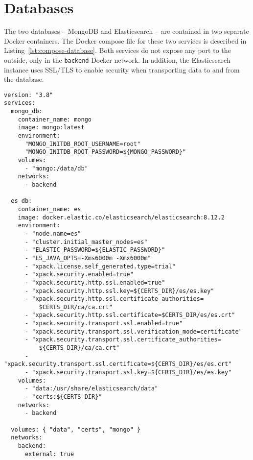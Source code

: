 \section{Databases}\label{sec:databases2}
The two databases -- MongoDB and Elasticsearch -- are contained in two separate Docker containers.
The Docker compose file for these two services is described in Listing~\ref{lst:compose-database}.
Both services do not expose any port to the outside, only in the \verb|backend| Docker network.
In addition, the Elasticsearch instance uses SSL/TLS to enable security when transporting data to and from the database.

\begin{lstlisting}[language=docker-compose,caption={Docker compose for the databases},label={lst:compose-database},captionpos=b]
version: "3.8"
services:
  mongo_db:
    container_name: mongo
    image: mongo:latest
    environment:
      "MONGO_INITDB_ROOT_USERNAME=root"
      "MONGO_INITDB_ROOT_PASSWORD=${MONGO_PASSWORD}"
    volumes:
      - "mongo:/data/db"
    networks:
      - backend

  es_db:
    container_name: es
    image: docker.elastic.co/elasticsearch/elasticsearch:8.12.2
    environment:
      - "node.name=es"
      - "cluster.initial_master_nodes=es"
      - "ELASTIC_PASSWORD=${ELASTIC_PASSWORD}"
      - "ES_JAVA_OPTS=-Xms6000m -Xmx6000m"
      - "xpack.license.self_generated.type=trial"
      - "xpack.security.enabled=true"
      - "xpack.security.http.ssl.enabled=true"
      - "xpack.security.http.ssl.key=${CERTS_DIR}/es/es.key"
      - "xpack.security.http.ssl.certificate_authorities=
          $CERTS_DIR/ca/ca.crt"
      - "xpack.security.http.ssl.certificate=$CERTS_DIR/es/es.crt"
      - "xpack.security.transport.ssl.enabled=true"
      - "xpack.security.transport.ssl.verification_mode=certificate"
      - "xpack.security.transport.ssl.certificate_authorities=
          ${CERTS_DIR}/ca/ca.crt"
      - "xpack.security.transport.ssl.certificate=${CERTS_DIR}/es/es.crt"
      - "xpack.security.transport.ssl.key=${CERTS_DIR}/es/es.key"
    volumes:
      - "data:/usr/share/elasticsearch/data"
      - "certs:${CERTS_DIR}"
    networks:
      - backend

  volumes: { "data", "certs", "mongo" }
  networks:
    backend:
      external: true
\end{lstlisting}
